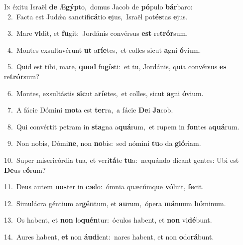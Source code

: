\lettrine{\initial\textcolor{\initialcolor}{I}}{n} éxitu Israël \textbf{de} Æ\-\textbf{gýp}\-to,~\star domus Jacob de \textbf{pó}\-pulo \textbf{bár}\-baro:\\
{\numbfont\textcolor{\numbcolor}{~2.}}~Facta est Judǽa sanctifi\-\textbf{cá}\-tio \textbf{e}\-jus,~\star Israël pot\-\textbf{és}\-tas \textbf{e}\-jus.\par
{\numbfont\textcolor{\numbcolor}{~3.}}~Mare \textbf{vi}\-dit, et \textbf{fu}\-git:~\star Jordánis convérsus \textbf{est} re\-\textbf{trór}\-sum.\par
{\numbfont\textcolor{\numbcolor}{~4.}}~Montes exsultavérunt \textbf{ut} a\-\textbf{rí}\-\textbf{e}tes,~\star et colles sicut \textbf{a}\-gni \textbf{ó}\-vium.\par
{\numbfont\textcolor{\numbcolor}{~5.}}~Quid est tibi, mare, \textbf{quod} fu\-\textbf{gís}\-ti:~\star et tu, Jordánis, quia convérsus \textbf{es} re\-\textbf{trór}\-sum?\par
{\numbfont\textcolor{\numbcolor}{~6.}}~Montes, exsultástis \textbf{sic}\-ut a\-\textbf{rí}\-\textbf{e}tes,~\star et colles, sicut \textbf{a}\-gni \textbf{ó}\-vium.\par
{\numbfont\textcolor{\numbcolor}{~7.}}~A fácie Dómini \textbf{mo}\-ta est \textbf{ter}\-ra,~\star a fácie \textbf{De}\-i \textbf{Ja}\-cob.\par
{\numbfont\textcolor{\numbcolor}{~8.}}~Qui convértit petram in \textbf{sta}\-gna a\-\textbf{quá}\-rum,~\star et rupem in \textbf{fon}\-tes a\-\textbf{quá}\-rum.\par
{\numbfont\textcolor{\numbcolor}{~9.}}~Non nobis, Dómi\-\textbf{ne}\-, non \textbf{no}\-bis:~\star sed nómini \textbf{tu}\-o da \textbf{gló}\-riam.\par
{\numbfont\textcolor{\numbcolor}{10.}}~Super misericórdia tua, et veri\-\textbf{tá}\-te \textbf{tu}\-a:~\star nequándo dicant gentes: Ubi est \textbf{De}\-us e\-\textbf{ó}\-rum?\par
{\numbfont\textcolor{\numbcolor}{11.}}~Deus autem \textbf{nos}\-ter in \textbf{cæ}\-lo:~\star ómnia quæcúmque \textbf{vó}\-luit, \textbf{fe}\-cit.\par
{\numbfont\textcolor{\numbcolor}{12.}}~Simulácra géntium ar\-\textbf{gén}\-tum, et \textbf{au}\-rum,~\star ópera \textbf{má}\-nuum \textbf{hó}\-minum.\par
{\numbfont\textcolor{\numbcolor}{13.}}~Os habent, et \textbf{non} lo\-\textbf{quén}\-tur:~\star óculos habent, et \textbf{non} vi\-\textbf{dé}\-bunt.\par
{\numbfont\textcolor{\numbcolor}{14.}}~Aures habent, \textbf{et} non \textbf{áu}\-\textbf{di}ent:~\star nares habent, et non \textbf{o}\-do\-\textbf{rá}\-bunt.\par
